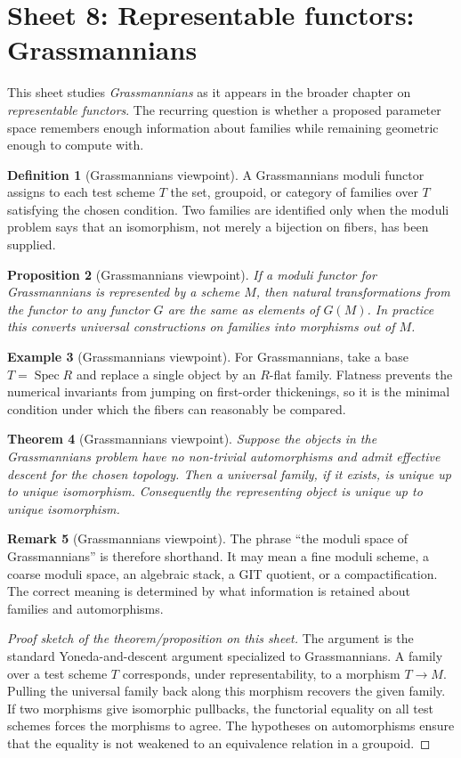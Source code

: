 \documentclass[11pt]{amsart}
\newtheorem{theorem}{Theorem}[section]
\newtheorem{proposition}[theorem]{Proposition}
\theoremstyle{definition}
\newtheorem{definition}[theorem]{Definition}
\newtheorem{example}[theorem]{Example}
\newtheorem{remark}[theorem]{Remark}
\newcommand{\Spec}{\operatorname{Spec}}
\begin{document}
\section{Sheet 8: Representable functors: Grassmannians}
This sheet studies \emph{Grassmannians} as it appears in the broader chapter on \emph{representable functors}.  The recurring question is whether a proposed parameter space remembers enough information about families while remaining geometric enough to compute with.
\begin{definition}[Grassmannians viewpoint]
A Grassmannians moduli functor assigns to each test scheme $T$ the set, groupoid, or category of families over $T$ satisfying the chosen condition.  Two families are identified only when the moduli problem says that an isomorphism, not merely a bijection on fibers, has been supplied.
\end{definition}
\begin{proposition}[Grassmannians viewpoint]
If a moduli functor for Grassmannians is represented by a scheme $M$, then natural transformations from the functor to any functor $G$ are the same as elements of $G(M)$.  In practice this converts universal constructions on families into morphisms out of $M$.
\end{proposition}
\begin{example}[Grassmannians viewpoint]
For Grassmannians, take a base $T=\Spec R$ and replace a single object by an $R$-flat family.  Flatness prevents the numerical invariants from jumping on first-order thickenings, so it is the minimal condition under which the fibers can reasonably be compared.
\end{example}
\begin{theorem}[Grassmannians viewpoint]
Suppose the objects in the Grassmannians problem have no non-trivial automorphisms and admit effective descent for the chosen topology.  Then a universal family, if it exists, is unique up to unique isomorphism.  Consequently the representing object is unique up to unique isomorphism.
\end{theorem}
\begin{remark}[Grassmannians viewpoint]
The phrase ``the moduli space of Grassmannians'' is therefore shorthand.  It may mean a fine moduli scheme, a coarse moduli space, an algebraic stack, a GIT quotient, or a compactification.  The correct meaning is determined by what information is retained about families and automorphisms.
\end{remark}
\begin{proof}[Proof sketch of the theorem/proposition on this sheet]
The argument is the standard Yoneda-and-descent argument specialized to Grassmannians.  A family over a test scheme $T$ corresponds, under representability, to a morphism $T\to M$.  Pulling the universal family back along this morphism recovers the given family.  If two morphisms give isomorphic pullbacks, the functorial equality on all test schemes forces the morphisms to agree.  The hypotheses on automorphisms ensure that the equality is not weakened to an equivalence relation in a groupoid.
\end{proof}
\end{document}
